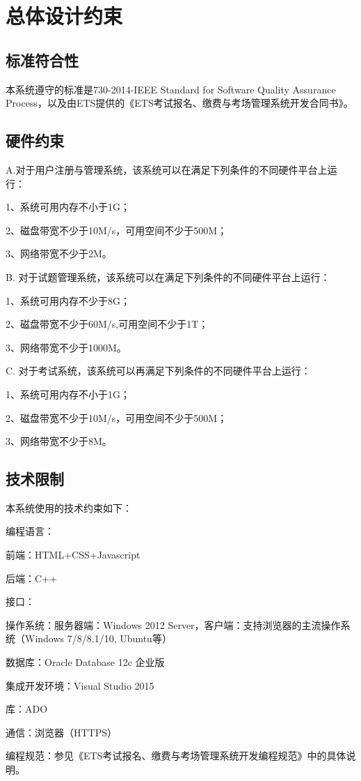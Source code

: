 \chapter{总体设计约束}
 
\section{标准符合性}
本系统遵守的标准是730-2014-IEEE Standard for Software Quality Assurance Process，以及由ETS提供的《ETS考试报名、缴费与考场管理系统开发合同书》。

\section{硬件约束}
A.对于用户注册与管理系统，该系统可以在满足下列条件的不同硬件平台上运行：

1、系统可用内存不小于1G；

2、磁盘带宽不少于10M/s，可用空间不少于500M；

3、网络带宽不少于2M。

B. 对于试题管理系统，该系统可以在满足下列条件的不同硬件平台上运行：

1、系统可用内存不少于8G；

2、磁盘带宽不少于60M/s,可用空间不少于1T；

3、网络带宽不少于1000M。

C. 对于考试系统，该系统可以再满足下列条件的不同硬件平台上运行：

1、系统可用内存不小于1G；

2、磁盘带宽不少于10M/s，可用空间不少于500M；

3、网络带宽不少于8M。

\section{技术限制}
本系统使用的技术约束如下：

编程语言：

	前端：HTML+CSS+Javascript

	后端：C++

接口：

	操作系统：服务器端：Windows 2012 Server，客户端：支持浏览器的主流操作系统（Windows 7/8/8.1/10, Ubuntu等）
	
	数据库：Oracle Database 12c 企业版
	
	集成开发环境：Visual Studio 2015
	
	库：ADO
	
	通信：浏览器（HTTPS）
	
	编程规范：参见《ETS考试报名、缴费与考场管理系统开发编程规范》中的具体说明。
